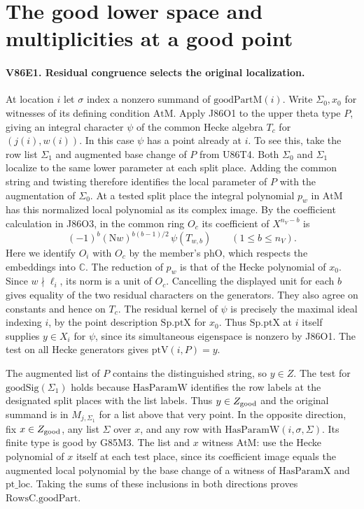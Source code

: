 \section{The good lower space and multiplicities at a good point}

\paragraph{V86E1. Residual congruence selects the original localization.}
At location $i$ let $\sigma$ index a nonzero summand of
$\mathrm{goodPartM}(i)$. Write $\Sigma_0,x_0$ for witnesses of
its defining condition $\mathrm{AtM}$. Apply J86O1 to the upper
theta type $P$, giving an integral character $\psi$ of the common
Hecke algebra $T_c$ for $(j(i),w(i))$. In this case $\psi$ has a
point already at $i$. To see this, take the row list $\Sigma_1$
and augmented base change of $P$ from U86T4. Both $\Sigma_0$
and $\Sigma_1$ localize to the same lower parameter at each split
place. Adding the common string and twisting therefore identifies
the local parameter of $P$ with the augmentation of $\Sigma_0$.
At a tested split place the integral polynomial $p_w$ in
$\mathrm{AtM}$ has this normalized local polynomial as its
complex image. By the coefficient calculation in J86O3, in the
common ring $O_c$ its coefficient of $X^{n_V-b}$ is
\[
    (-1)^b(\mathrm Nw)^{b(b-1)/2}\,\psi(T_{w,b})
      \qquad(1\le b\le n_V).
\]
Here we identify $O_i$ with $O_c$ by the member's
$\mathrm{phO}$, which respects the embeddings into $\mathbb C$.
The reduction of $p_w$ is that of the Hecke polynomial of $x_0$.
Since $w\nmid\ell_i$, its norm is a unit of $O_c$. Cancelling
the displayed unit for each $b$ gives equality of the two residual
characters on the generators. They also agree on constants and
hence on $T_c$. The residual kernel of $\psi$ is precisely
the maximal ideal indexing $i$, by the point description
$\mathrm{Sp.ptX}$ for $x_0$. Thus $\mathrm{Sp.ptX}$ at $i$
itself supplies $y\in X_i$ for $\psi$, since its simultaneous
eigenspace is nonzero by J86O1. The test on all Hecke generators
gives $\mathrm{ptV}(i,P)=y$.

The augmented list of $P$ contains the distinguished string,
so $y\in Z$. The test for $\mathrm{goodSig}(\Sigma_1)$ holds
because $\mathrm{HasParamW}$ identifies the row labels at the
designated split places with the list labels. Thus $y\in Z_{\rm good}$
and the original summand is in $M_{j,\Sigma_1}$ for a list above
that very point. In the opposite direction, fix $x\in Z_{\rm good}$,
any list $\Sigma$ over $x$, and any row with
$\mathrm{HasParamW}(i,\sigma,\Sigma)$. Its finite type is good
by G85M3. The list and $x$ witness $\mathrm{AtM}$: use the
Hecke polynomial of $x$ itself at each test place, since its
coefficient image equals the augmented local polynomial by the
base change of a witness of $\mathrm{HasParamX}$ and
$\mathrm{pt\_loc}$. Taking the sums of these inclusions in
both directions proves $\mathrm{RowsC.goodPart}$.

